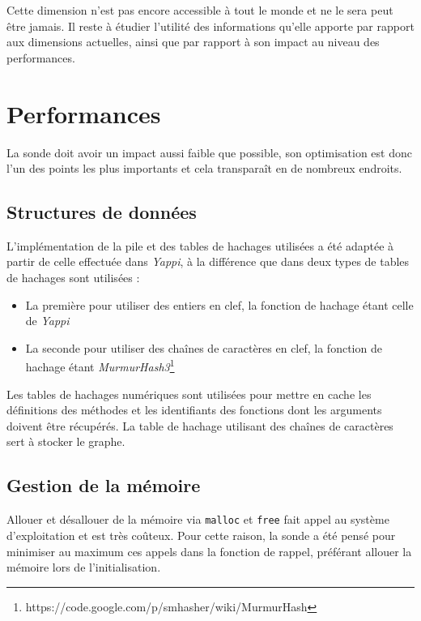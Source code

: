 \begin{note}
Cette dimension n'est pas encore accessible à tout le monde et ne le sera peut être jamais. Il reste à étudier l'utilité des informations qu'elle apporte par rapport aux dimensions actuelles, ainsi que par rapport à son impact au niveau des performances.
\end{note}

  \section{Performances}
  \label{sec:performances}
      
La sonde doit avoir un impact aussi faible que possible, son optimisation est donc l'un des points les plus importants et cela transparaît en de nombreux endroits.

\subsection{Structures de données}
L'implémentation de la pile et des tables de hachages utilisées a été adaptée à partir de celle effectuée dans \emph{Yappi}, à la différence que dans \Blackfire deux types de tables de hachages sont utilisées :
\begin{itemize}
\item La première pour utiliser des entiers en clef, la fonction de hachage étant celle de \emph{Yappi}
\item La seconde pour utiliser des chaînes de caractères en clef, la fonction de hachage étant \emph{MurmurHash3}\footnote{https://code.google.com/p/smhasher/wiki/MurmurHash}
\end{itemize}

Les tables de hachages numériques sont utilisées pour mettre en cache les définitions des méthodes et les identifiants des fonctions dont les arguments doivent être récupérés. La table de hachage utilisant des chaînes de caractères sert à stocker le graphe.

\subsection{Gestion de la mémoire}
Allouer et désallouer de la mémoire via \verb|malloc| et \verb|free| fait appel au système d'exploitation et est très coûteux. Pour cette raison, la sonde \Python a été pensé pour minimiser au maximum ces appels dans la fonction de rappel, préférant allouer la mémoire lors de l'initialisation.

